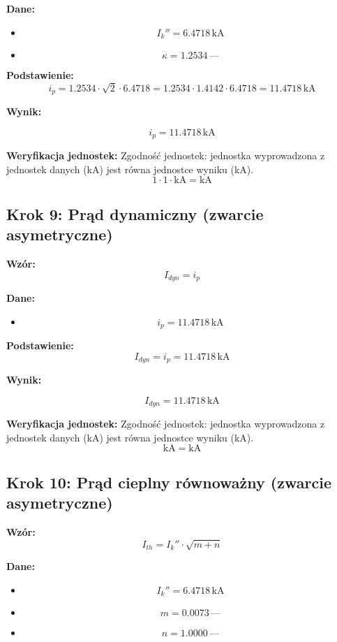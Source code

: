 \documentclass[11pt,a4paper]{article}
\begin{document}
\textbf{Dane:}
\begin{itemize}
  \item
$$
I_k'' = 6.4718\,\mathrm{kA}
$$
  \item
$$
\kappa = 1.2534\,\text{—}
$$
\end{itemize}

\textbf{Podstawienie:}
$$
i_p = 1.2534 \cdot \sqrt{2} \cdot 6.4718 = 1.2534 \cdot 1.4142 \cdot 6.4718 = 11.4718\,\text{kA}
$$

\textbf{Wynik:}
\begin{center}
$$
i_p = 11.4718\,\mathrm{kA}
$$
\end{center}

\textbf{Weryfikacja jednostek:} Zgodność jednostek: jednostka wyprowadzona z jednostek danych (kA) jest równa jednostce wyniku (kA).
$$
1 \cdot 1 \cdot \mathrm{kA} = \mathrm{kA}
$$

\subsection{Krok 9: Prąd dynamiczny (zwarcie asymetryczne)}

\textbf{Wzór:}
$$
I_{dyn} = i_p
$$

\textbf{Dane:}
\begin{itemize}
  \item
$$
i_p = 11.4718\,\mathrm{kA}
$$
\end{itemize}

\textbf{Podstawienie:}
$$
I_{dyn} = i_p = 11.4718\,\text{kA}
$$

\textbf{Wynik:}
\begin{center}
$$
I_{dyn} = 11.4718\,\mathrm{kA}
$$
\end{center}

\textbf{Weryfikacja jednostek:} Zgodność jednostek: jednostka wyprowadzona z jednostek danych (kA) jest równa jednostce wyniku (kA).
$$
\mathrm{kA} = \mathrm{kA}
$$

\subsection{Krok 10: Prąd cieplny równoważny (zwarcie asymetryczne)}

\textbf{Wzór:}
$$
I_{th} = I_k'' \cdot \sqrt{m + n}
$$

\textbf{Dane:}
\begin{itemize}
  \item
$$
I_k'' = 6.4718\,\mathrm{kA}
$$
  \item
$$
m = 0.0073\,\text{—}
$$
  \item
$$
n = 1.0000\,\text{—}
$$
\end{itemize}
\end{document}
